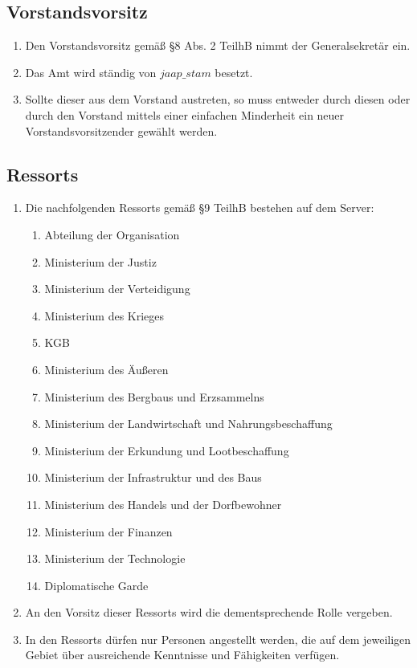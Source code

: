\documentclass{article}
\begin{document}
\subsection{Vorstandsvorsitz}
\begin{enumerate}[(1)]
	\item Den Vorstandsvorsitz gemäß §8 Abs. 2 TeilhB nimmt der Generalsekretär ein.
	\item Das Amt wird ständig von $jaap\_stam$ besetzt.
	\item Sollte dieser aus dem Vorstand austreten, so muss entweder durch diesen oder durch den Vorstand mittels einer einfachen Minderheit ein neuer Vorstandsvorsitzender gewählt werden.
\end{enumerate}

\subsection{Ressorts}
\begin{enumerate}[(1)]
	\item Die nachfolgenden Ressorts gemäß §9 TeilhB bestehen auf dem Server:
		\begin{enumerate}[1.]
			\item Abteilung der Organisation
			\item Ministerium der Justiz
			\item Ministerium der Verteidigung
			\item Ministerium des Krieges
			\item KGB
			\item Ministerium des Äußeren
			\item Ministerium des Bergbaus und Erzsammelns
			\item Ministerium der Landwirtschaft und Nahrungsbeschaffung
			\item Ministerium der Erkundung und Lootbeschaffung
			\item Ministerium der Infrastruktur und des Baus
			\item Ministerium des Handels und der Dorfbewohner
			\item Ministerium der Finanzen
			\item Ministerium der Technologie
			\item Diplomatische Garde
		\end{enumerate}
	\item An den Vorsitz dieser Ressorts wird die dementsprechende Rolle vergeben.
	\item In den Ressorts dürfen nur Personen angestellt werden, die auf dem jeweiligen Gebiet über ausreichende Kenntnisse und Fähigkeiten verfügen.
\end{enumerate}
\end{document}

